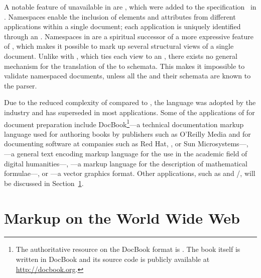 A notable feature of  unavailable in  are
, which were added to the
 specification~\cite{bray99} in \citeyear{bray99}. Namespaces
enable the inclusion of elements and attributes from different 
applications within a single  document; each application is
uniquely identified through an . Namespaces in  are a
spiritual successor of a more expressive  feature of
, which makes it possible
to mark up several structural views of a single document. Unlike with
, which ties each view to an  ,
there exists no general mechanism for the translation of the  to
 schemata. This makes it impossible to validate namespaced
 documents, unless all the  and their schemata are
known to the parser.


Due to the reduced complexity of  compared to , the
language was adopted by the industry and has superseded  in most
applications. Some of the applications of  for document preparation
include DocBook\footnote{
  The authoritative resource on the DocBook  format is
  . The book itself is written in DocBook and its source code
  is publicly available at \url{http://docbook.org}.
}---a technical documentation markup language used for authoring books by
publishers such as O'Reilly Media and for documenting software at companies such
as Red Hat, , or Sun Microsystems---, ---a general
text encoding markup language for the use in the academic field of digital
humanities---, ---a markup language for the description of
mathematical formulae---, or ---a vector graphics format. Other
 applications, such as  and
/, will be discussed in
Section~\ref{sec:www-markup}.
      
\section{Markup on the World Wide Web}\label{sec:www-markup}
